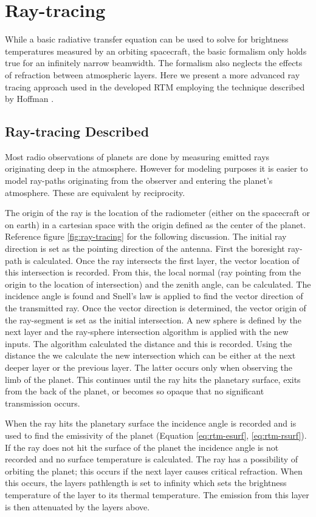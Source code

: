 \section{Ray-tracing}
While a basic radiative transfer equation can be used to solve for brightness temperatures measured by an orbiting spacecraft, the basic formalism only holds true for an infinitely narrow beamwidth. The formalism also neglects the effects of refraction between atmospheric layers. Here we present a more advanced ray tracing approach used in the developed RTM employing the technique described by Hoffman \cite{Hoffman-thesis}.
\subsection{Ray-tracing Described}
Most radio observations of planets are done by measuring emitted rays originating deep in the atmosphere. However for modeling purposes it is easier to model ray-paths originating from the observer and entering the planet's atmosphere. These are equivalent by reciprocity.

The origin of the ray is the location of the radiometer (either on the spacecraft or on earth) in a cartesian space with the origin defined as the center of the planet. Reference figure \ref{fig:ray-tracing} for the following discussion. The initial ray direction is set as the pointing direction of the antenna. First the boresight ray-path is calculated.  Once the ray intersects the first layer, the vector location of this intersection is recorded. From this, the local normal (ray pointing from the origin to the location of intersection) and the zenith angle, can be calculated. The incidence angle is found and Snell's law is applied to find the vector direction of the transmitted ray. Once the vector direction is determined, the vector origin of the ray-segment is set as the initial intersection. A new sphere is defined by the next layer and the ray-sphere intersection algorithm is applied with the new inputs. The algorithm calculated the distance and this is recorded. Using the distance the we calculate the new intersection which can be either at the next deeper layer or the previous layer. The latter occurs only when observing the limb of the planet. This continues until the ray hits the planetary surface, exits from the back of the planet, or becomes so opaque that no significant transmission occurs. 

When the ray hits the planetary surface the incidence angle is recorded and is used to find the emissivity of the planet (Equation \ref{eq:rtm-esurf}, \ref{eq:rtm-rsurf}). If the ray does not hit the surface of the planet the incidence angle is not recorded and no surface temperature is calculated. The ray has a possibility of orbiting the planet; this occurs if the next layer causes critical refraction. When this occurs, the layers pathlength is set to infinity which sets the brightness temperature of the layer to its thermal temperature. The emission from this layer is then attenuated by the layers above.

